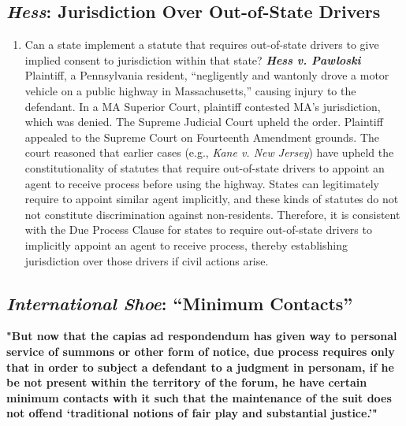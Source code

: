 \subsection{\emph{Hess}: Jurisdiction Over Out-of-State Drivers}

\begin{enumerate}
    \item Can a state implement a statute that requires out-of-state drivers to give implied consent to jurisdiction within that state? \textbf{\emph{Hess v. Pawloski}} Plaintiff, a Pennsylvania resident, ``negligently and wantonly drove a motor vehicle on a public highway in Massachusetts,'' causing injury to the defendant. In a MA Superior Court, plaintiff contested MA's jurisdiction, which was denied. The Supreme Judicial Court upheld the order. Plaintiff appealed to the Supreme Court on Fourteenth Amendment grounds. The court reasoned that earlier cases (e.g., \emph{Kane v. New Jersey}) have upheld the constitutionality of statutes that require out-of-state drivers to appoint an agent to receive process before using the highway. States can legitimately require to appoint similar agent implicitly, and these kinds of statutes do not not constitute discrimination against non-residents. Therefore, it is consistent with the Due Process Clause for states to require out-of-state drivers to implicitly appoint an agent to receive process, thereby establishing jurisdiction over those drivers if civil actions arise.
\end{enumerate}

\subsection{\emph{International Shoe}: ``Minimum Contacts''}

\textbf{"But now that the capias ad respondendum has given way to personal service of summons or other form of notice, due process requires only that in order to subject a defendant to a judgment in personam, if he be not present within the territory of the forum, he have certain minimum contacts with it such that the maintenance of the suit does not offend `traditional notions of fair play and substantial justice.'"}

